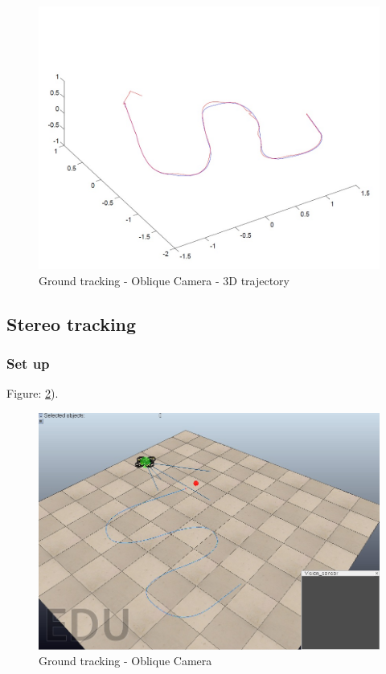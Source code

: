 \begin{figure}[h]
\centering
\includegraphics[width=0.7\linewidth]{../Images/c3/sim2_traj_both_3d}
\caption{Ground tracking - Oblique Camera - 3D trajectory}
\label{fig:sim2_traj_both_3d}
\end{figure}




\subsection{Stereo tracking}
\subsubsection{Set up}

Figure: \ref{fig:sim3_set_up}).

\begin{figure}[h]
	\centering
	\includegraphics[width=0.7\linewidth]{../Images/c3/ground_tracking_scene_oblique}
	\caption{Ground tracking - Oblique Camera}
	\label{fig:sim3_set_up}
\end{figure}

